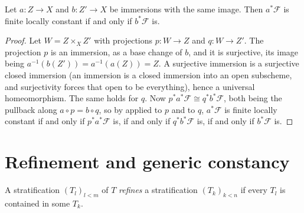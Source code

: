 \begin{lemma}
\label{lemma:constructible-immersion-independence}
\leanok
Let $a\colon Z\to X$ and $b\colon Z'\to X$ be immersions with the same
image.  Then $a^*\mathcal F$ is finite locally constant if and only if
$b^*\mathcal F$ is.
\end{lemma}
\begin{proof}
\leanok
Let $W=Z\times_XZ'$ with projections $p\colon W\to Z$ and $q\colon W\to Z'$.
The projection $p$ is an immersion, as a base change of $b$, and it is
surjective, its image being $a^{-1}(b(Z'))=a^{-1}(a(Z))=Z$.  A surjective
immersion is a surjective closed immersion (an immersion is a closed
immersion into an open subscheme, and surjectivity forces that open to be
everything), hence a universal homeomorphism.  The same holds for $q$.  Now
$p^*a^*\mathcal F\cong q^*b^*\mathcal F$, both being the pullback along
$a\circ p=b\circ q$, so by
 applied to
$p$ and to $q$, $a^*\mathcal F$ is finite locally constant if and only if
$p^*a^*\mathcal F$ is, if and only if $q^*b^*\mathcal F$ is, if and only if
$b^*\mathcal F$ is.
\end{proof}

\section{Refinement and generic constancy}\label{sec:constructible-refinement}

\begin{definition}[Refinement]\label{def:constructible-refines}
\leanok
A stratification $(T_l)_{l<m}$ of $T$ \emph{refines} a stratification
$(T_k)_{k<n}$ if every $T_l$ is contained in some $T_k$.
\end{definition}

